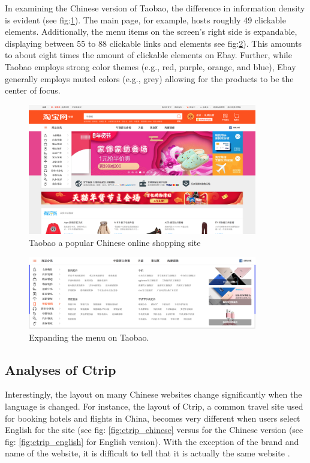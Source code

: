 In examining the Chinese version of Taobao, the difference in information density is evident (see fig:\ref{fig:taobao}). The main page, for example, hosts roughly 49 clickable elements. Additionally, the menu items on the screen's right side is expandable, displaying between 55 to 88 clickable links and elements see fig:\ref{fig:taobao_menu}). This amounts to about eight times the amount of clickable elements on Ebay. Further, while Taobao employs strong color themes (e.g., red, purple, orange, and blue), Ebay generally employs muted colors (e.g., grey) allowing for the products to be the center of focus. 


\begin{figure}[h]
\centering
\includegraphics[width=100mm]{Images/Taobao}
\decoRule
\caption[Taobao]{Taobao a popular Chinese online shopping site}
\label{fig:taobao}
\end{figure}

\begin{figure}[h]
\centering
\includegraphics[width=100mm]{Images/Taobao_menu}
\decoRule
\caption[Taobao' menu bar]{Expanding the menu on Taobao.}
\label{fig:taobao_menu}
\end{figure}

\subsection{Analyses of Ctrip}
Interestingly, the layout on many Chinese websites change significantly when the language is changed. For instance, the layout of Ctrip, a common travel site used for booking hotels and flights in China, becomes very different when users select English for the site (see  fig: \ref{fig:ctrip_chinese} versus for the Chinese version (see fig: \ref{fig:ctrip_english} for English version). With the exception of the brand and name of the website, it is difficult to tell that it is actually the same website .

